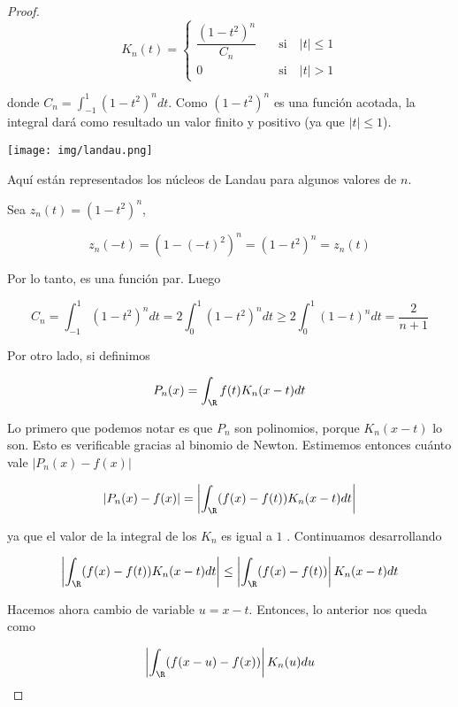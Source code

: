\begin{proof}
    \[
    K_n(t) = \begin{cases}
        \dfrac{(1-t^2)^n}{C_n}& \quad \text{si} \quad |t| \leq 1 \\
        0& \quad \text{si} \quad |t| > 1
    \end{cases}
    \]
    
    \noindent donde $\displaystyle C_n = \int_{-1}^1 (1-t^2)^ndt$. Como $(1-t^2)^n$ es una función acotada, la integral dará como resultado un valor finito y positivo (ya que $|t| \leq 1$).
    
    \begin{marginfigure}
        \centering
        \texttt{[image: img/landau.png]}
        \label{fig:stnwei1}
        \caption{\footnotesize Aquí están representados los núcleos de Landau para algunos valores de $n$.}
    \end{marginfigure}
    
    Sea $z_n(t) = (1-t^2)^n$,
    
    \[
    z_n(-t) = (1-(-t)^2)^n = (1-t^2)^n = z_n(t)
    \]
    
    Por lo tanto, es una función par. Luego
    
    \[
    C_n = \int_{-1}^1 (1-t^2)^ndt = 2\int_0^1 (1-t^2)^ndt \geq 2\int_0^1 (1-t)^ndt = \frac{2}{n+1}
    \]
    
    Por otro lado, si definimos
    
    \[
    P_n(x) = \int_{\R} f(t)K_n(x-t)dt
    \]
    
    Lo primero que podemos notar es que $P_n$ son polinomios, porque $K_n(x-t)$ lo son. Esto es verificable gracias al binomio de Newton. Estimemos entonces cuánto vale $|P_n(x) - f(x)|$
    
    \[
    |P_n(x) - f(x)| = \left| \int_{\R} (f(x) - f(t))K_n(x-t)dt \right|
    \]
    
    \noindent ya que el valor de la integral de los $K_n$ es igual a $1$ . Continuamos desarrollando
    
    \[
    \left| \int_{\R} (f(x) - f(t))K_n(x-t)dt \right| \leq \left| \int_{\R} (f(x) - f(t))\right| K_n(x-t)dt
    \]
    
    Hacemos ahora cambio de variable $u = x-t$. Entonces, lo anterior nos queda como
    
    \[
    \left| \int_{\R} (f(x-u) - f(x))\right| K_n(u)du
    \]
    

\end{proof}
